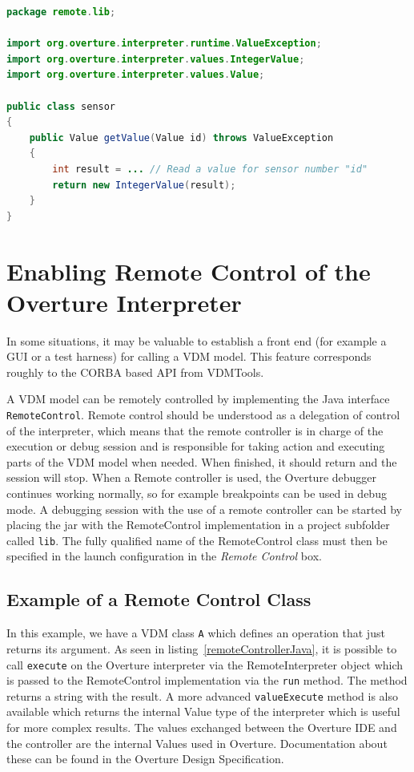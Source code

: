 \documentclass{overturerepchap}
\begin{document}
\begin{lstlisting}[language=JAVA,label=remoteSensorJava,caption=Remote sensor Java class,captionpos=b]
package remote.lib;

import org.overture.interpreter.runtime.ValueException;
import org.overture.interpreter.values.IntegerValue;
import org.overture.interpreter.values.Value;

public class sensor
{
	public Value getValue(Value id) throws ValueException
	{
		int result = ... // Read a value for sensor number "id"
		return new IntegerValue(result);
	}
}
\end{lstlisting}
\newpage
\section{Enabling Remote Control of the Overture Interpreter}\label{sec:remote}\label{sec:Remote}

In some situations, it may be valuable to establish a
front end (for example a GUI or a test harness) for calling a VDM model.
This feature corresponds roughly to the CORBA based API from VDMTools\cite{APIMan}.

A VDM model can be remotely controlled by implementing the Java interface \texttt{RemoteControl}. Remote control should be understood as a delegation of control of the interpreter, which means that the remote controller is in charge of the execution or debug session and is responsible for taking action and executing parts of the VDM model when needed. When finished, it should return and the session will stop. When a Remote controller is used, the Overture debugger continues working normally, so for example breakpoints can be used in debug mode. A debugging session with the use of a remote controller can be started by placing the  jar with the RemoteControl implementation in a project subfolder called \texttt{lib}. The fully qualified name of the RemoteControl class must then be specified in the launch configuration in the \textit{Remote Control} box.

\subsection{Example of a Remote Control Class}
In this example, we have a VDM class \texttt{A} which defines an operation
that just returns its argument. As
seen in listing~\ref{remoteControllerJava}, it is possible to call
\texttt{execute} on the Overture interpreter via the RemoteInterpreter object
which is passed to the RemoteControl implementation via the \texttt{run} method.
The method returns a string with the result. A more
advanced \texttt{valueExecute} method is also available which returns the internal
Value type of the interpreter which is useful for more complex
results. The values exchanged between the Overture IDE and the
controller are the internal Values used in Overture. Documentation about these
can be found in the Overture Design Specification\cite{Battle10}.
\end{document}
